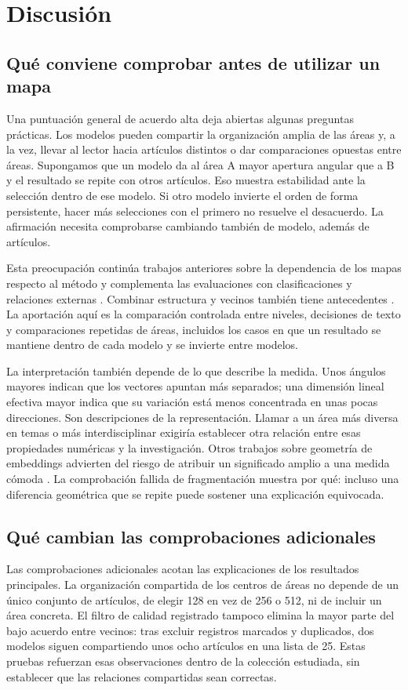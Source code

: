 \documentclass[12pt]{article}
\begin{document}
\FloatBarrier
\section{Discusión}
\subsection{Qué conviene comprobar antes de utilizar un mapa}
Una puntuación general de acuerdo alta deja abiertas algunas preguntas prácticas. Los modelos pueden compartir la organización amplia de las áreas y, a la vez, llevar al lector hacia artículos distintos o dar comparaciones opuestas entre áreas. Supongamos que un modelo da al área A mayor apertura angular que a B y el resultado se repite con otros artículos. Eso muestra estabilidad ante la selección dentro de ese modelo. Si otro modelo invierte el orden de forma persistente, hacer más selecciones con el primero no resuelve el desacuerdo. La afirmación necesita comprobarse cambiando también de modelo, además de artículos.

Esta preocupación continúa trabajos anteriores sobre la dependencia de los mapas respecto al método \citep{refa0d2d707e6,ref6a2f5912bc} y complementa las evaluaciones con clasificaciones y relaciones externas \citep{refbe130e2973,refc0e2cc29e0}. Combinar estructura y vecinos también tiene antecedentes \citep{ref4e1e0d5582}. La aportación aquí es la comparación controlada entre niveles, decisiones de texto y comparaciones repetidas de áreas, incluidos los casos en que un resultado se mantiene dentro de cada modelo y se invierte entre modelos.

La interpretación también depende de lo que describe la medida. Unos ángulos mayores indican que los vectores apuntan más separados; una dimensión lineal efectiva mayor indica que su variación está menos concentrada en unas pocas direcciones. Son descripciones de la representación. Llamar a un área más diversa en temas o más interdisciplinar exigiría establecer otra relación entre esas propiedades numéricas y la investigación. Otros trabajos sobre geometría de embeddings advierten del riesgo de atribuir un significado amplio a una medida cómoda \citep{rudman-etal-2022-isoscore}. La comprobación fallida de fragmentación muestra por qué: incluso una diferencia geométrica que se repite puede sostener una explicación equivocada.

\subsection{Qué cambian las comprobaciones adicionales}
Las comprobaciones adicionales acotan las explicaciones de los resultados principales. La organización compartida de los centros de áreas no depende de un único conjunto de artículos, de elegir 128 en vez de 256 o 512, ni de incluir un área concreta. El filtro de calidad registrado tampoco elimina la mayor parte del bajo acuerdo entre vecinos: tras excluir registros marcados y duplicados, dos modelos siguen compartiendo unos ocho artículos en una lista de 25. Estas pruebas refuerzan esas observaciones dentro de la colección estudiada, sin establecer que las relaciones compartidas sean correctas.
\end{document}
